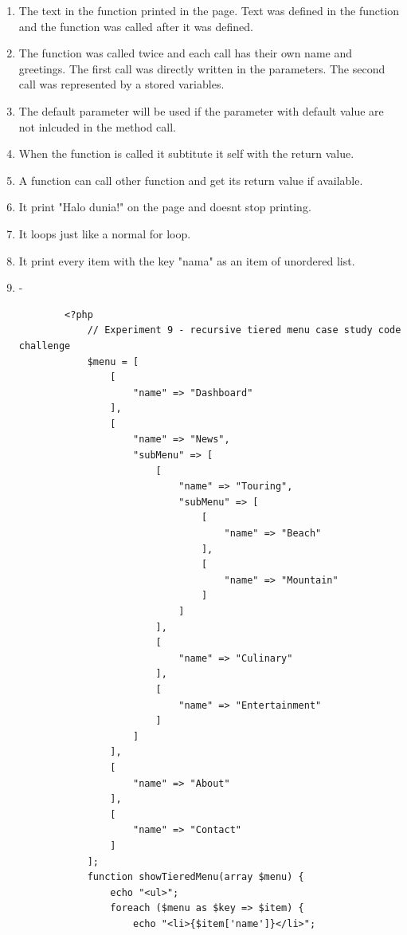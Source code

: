 \documentclass[12pt,titlepage]{article}
\begin{document}
\begin{enumerate}
    \item The text in the function printed in the page. Text was defined in the function and the function was called after it was defined.
    \item The function was called twice and each call has their own name and greetings. The first call was directly written in the parameters. The second call was represented by a stored variables.
    \item The default parameter will be used if the parameter with default value are not inlcuded in the method call.
    \item When the function is called it subtitute it self with the return value.
    \item A function can call other function and get its return value if available.
    \item It print "Halo dunia!" on the page and doesnt stop printing.
    \item It loops just like a normal for loop.
    \item It print every item with the key "nama" as an item of unordered list.
    \item -
    \begin{verbatim}
        <?php
            // Experiment 9 - recursive tiered menu case study code challenge
            $menu = [
                [
                    "name" => "Dashboard"
                ],
                [
                    "name" => "News",
                    "subMenu" => [
                        [
                            "name" => "Touring",
                            "subMenu" => [
                                [
                                    "name" => "Beach"
                                ],
                                [
                                    "name" => "Mountain"
                                ]
                            ]
                        ],
                        [
                            "name" => "Culinary"
                        ],
                        [
                            "name" => "Entertainment"
                        ]
                    ]
                ],
                [
                    "name" => "About"
                ],
                [
                    "name" => "Contact"
                ]
            ];
            function showTieredMenu(array $menu) {
                echo "<ul>";
                foreach ($menu as $key => $item) {
                    echo "<li>{$item['name']}</li>";

\end{verbatim}
\end{enumerate}
\end{document}
